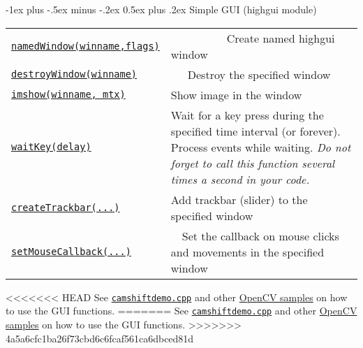 \documentclass[10pt,landscape]{article}
\makeatletter
\renewcommand{\section}{\@startsection{section}{1}{0mm}%
                                {-1ex plus -.5ex minus -.2ex}%
                                {0.5ex plus .2ex}%
                                {\normalfont\large\bfseries}}
\makeatother
\begin{document}
\begin{multicols}{3}
\section{Simple GUI (highgui module)}

\begin{tabular}{@{}p{\the\MyLen}%
                @{}p{\linewidth-\the\MyLen}@{}}

\texttt{\href{http://docs.opencv.org/modules/highgui/doc/user_interface.html\#namedwindow}{namedWindow(winname,flags)}} & \ \ \ \ \ \ \ \ \ \ Create named highgui window \\

\texttt{\href{http://docs.opencv.org/modules/highgui/doc/user_interface.html\#destroywindow}{destroyWindow(winname)}} & \ \ \ Destroy the specified window \\

\texttt{\href{http://docs.opencv.org/modules/highgui/doc/user_interface.html\#imshow}{imshow(winname, mtx)}} & Show image in the window \\

\texttt{\href{http://docs.opencv.org/modules/highgui/doc/user_interface.html\#waitkey}{waitKey(delay)}} & Wait for a key press during the specified time interval (or forever). Process events while waiting. \emph{Do not forget to call this function several times a second in your code.} \\

\texttt{\href{http://docs.opencv.org/modules/highgui/doc/user_interface.html\#createtrackbar}{createTrackbar(...)}} & Add trackbar (slider) to the specified window \\

\texttt{\href{http://docs.opencv.org/modules/highgui/doc/user_interface.html\#setmousecallback}{setMouseCallback(...)}} & \ \ Set the callback on mouse clicks and movements in the specified window \\

\end{tabular}

<<<<<<< HEAD
See \texttt{\href{https://github.com/Itseez/opencv/tree/master/samples/cpp/camshiftdemo.cpp}{camshiftdemo.cpp}} and other \href{https://github.com/Itseez/opencv/tree/master/samples/}{OpenCV samples} on how to use the GUI functions.
=======
See \texttt{\href{https://github.com/opencv/opencv/tree/master/samples/cpp/camshiftdemo.cpp}{camshiftdemo.cpp}} and other \href{https://github.com/opencv/opencv/tree/master/samples/}{OpenCV samples} on how to use the GUI functions.
>>>>>>> 4a5a6cfc1ba26f73cbd6c6fcaf561ca6dbced81d


\end{multicols}
\end{document}
